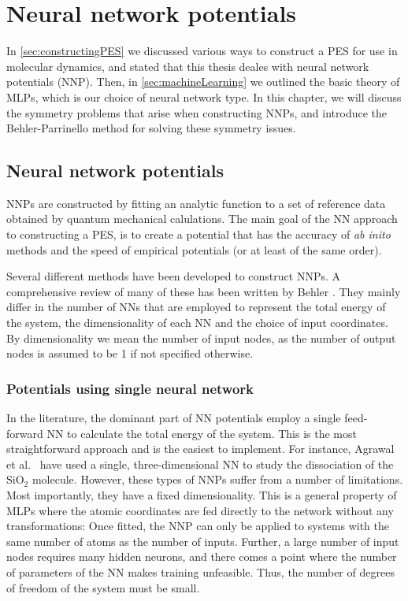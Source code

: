 \documentclass[twoside,english]{uiofysmaster}
\begin{document}
\chapter{Neural network potentials} \label{sec:NNPs}
In \autoref{sec:constructingPES} we discussed various ways to construct a PES for use in molecular dynamics, and
stated that this thesis deales with neural network potentials (NNP). Then, in \autoref{sec:machineLearning}
we outlined the basic theory of MLPs, which is our choice of neural network type. In this chapter, 
we will discuss the symmetry problems that arise when constructing NNPs, and introduce the Behler-Parrinello method for 
solving these symmetry issues. 

\section{Neural network potentials}
NNPs are constructed by fitting an analytic function to a set of reference data
obtained by quantum mechanical calulations.
The main goal of the NN approach to constructing a PES, is to create a potential that has the accuracy of \textit{ab inito}
methods and the speed of empirical potentials (or at least of the same order).

Several different methods have been developed to construct NNPs. A comprehensive review of many of these 
has been written by Behler \cite{Behler11general}. They mainly differ in the number of NNs that are employed 
to represent the total energy of the system, the dimensionality of each NN and the choice of input coordinates. 
By dimensionality we mean the number of input nodes, as the number of output nodes is assumed to be 1 if not specified otherwise. 

\subsection{Potentials using single neural network}
In the literature, the dominant part of NN potentials employ a single feed-forward NN to calculate the total energy of the system.
This is the most straightforward approach and is the easiest to implement.
For instance, Agrawal et al.\ \cite{Agrawal06} have used a single, three-dimensional NN to study the dissociation of the 
$\mathrm{SiO}_2$ molecule. However, these types of NNPs suffer from a number of limitations. Most importantly, 
they have a fixed dimensionality. This is a general property of MLPs where the atomic coordinates are fed directly 
to the network without any transformations: Once fitted, the NNP can only be applied to systems with the same number of atoms
as the number of inputs. Further, a large number of input nodes requires many hidden neurons, and there comes a point 
where the number of parameters of the NN makes training unfeasible. Thus, the number of degrees of freedom of the system 
must be small. 
\end{document}
